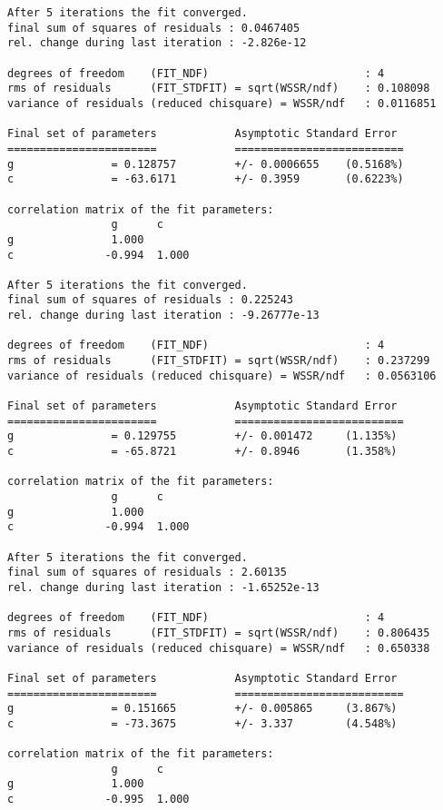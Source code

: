     \begin{verbatim}
After 5 iterations the fit converged.
final sum of squares of residuals : 0.0467405
rel. change during last iteration : -2.826e-12

degrees of freedom    (FIT_NDF)                        : 4
rms of residuals      (FIT_STDFIT) = sqrt(WSSR/ndf)    : 0.108098
variance of residuals (reduced chisquare) = WSSR/ndf   : 0.0116851

Final set of parameters            Asymptotic Standard Error
=======================            ==========================
g               = 0.128757         +/- 0.0006655    (0.5168%)
c               = -63.6171         +/- 0.3959       (0.6223%)

correlation matrix of the fit parameters:
                g      c      
g               1.000 
c              -0.994  1.000    

After 5 iterations the fit converged.
final sum of squares of residuals : 0.225243
rel. change during last iteration : -9.26777e-13

degrees of freedom    (FIT_NDF)                        : 4
rms of residuals      (FIT_STDFIT) = sqrt(WSSR/ndf)    : 0.237299
variance of residuals (reduced chisquare) = WSSR/ndf   : 0.0563106

Final set of parameters            Asymptotic Standard Error
=======================            ==========================
g               = 0.129755         +/- 0.001472     (1.135%)
c               = -65.8721         +/- 0.8946       (1.358%)

correlation matrix of the fit parameters:
                g      c      
g               1.000 
c              -0.994  1.000 

After 5 iterations the fit converged.
final sum of squares of residuals : 2.60135
rel. change during last iteration : -1.65252e-13

degrees of freedom    (FIT_NDF)                        : 4
rms of residuals      (FIT_STDFIT) = sqrt(WSSR/ndf)    : 0.806435
variance of residuals (reduced chisquare) = WSSR/ndf   : 0.650338

Final set of parameters            Asymptotic Standard Error
=======================            ==========================
g               = 0.151665         +/- 0.005865     (3.867%)
c               = -73.3675         +/- 3.337        (4.548%)

correlation matrix of the fit parameters:
                g      c      
g               1.000 
c              -0.995  1.000 
    \end{verbatim}